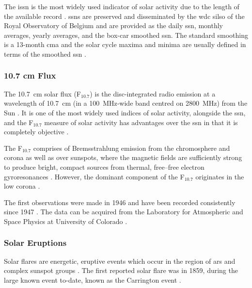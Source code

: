The \gls{issn} is the most widely used indicator of solar activity due to the length of the available record \citep{hathaway_solar_2015}. \glspl{ssn} are preserved and disseminated by the \gls{wdc} \gls{silso} of the Royal Observatory of Belgium \citep{silso_world_data_center_international_1954} and are provided as the daily \gls{ssn}, monthly averages, yearly averages, and the box-car smoothed \gls{ssn}. The standard smoothing is a 13-month \gls{cma} and the solar cycle maxima and minima are usually defined in terms of the smoothed \gls{ssn} \citep{hathaway_solar_2015}.



\subsubsection*{10.7 cm Flux}

The 10.7~cm solar flux (F$_{10.7}$) is the disc-integrated radio emission at a wavelength of 10.7~cm (in a 100~MHz‐wide band centred on 2800~MHz) from the Sun \citep{tapping_limits_1994,tapping_107_2013}. It is one of the most widely used indices of solar activity, alongside the \gls{ssn}, and the F$_{10.7}$ measure of solar activity has advantages over the \gls{ssn} in that it is completely objective \citep{hathaway_solar_2015}.

The F$_{10.7}$ comprises of Bremsstrahlung emission from the chromosphere and corona as well as over sunspots, where the magnetic fields are sufficiently strong to produce bright, compact sources from thermal, free–free electron gyroresonances \citep{tapping_origin_1990, tapping_107_2013}. However, the dominant component of the F$_{10.7}$ originates in the low corona \citep{tapping_origin_1990}.

The first observations were made in 1946 and have been recorded consistently since 1947 \citep{covington_solar_1969, tapping_107_2013}. The data can be acquired from the Laboratory for Atmospheric and Space Physics at University of Colorado \citep{lisird_solar_2019}.



\subsubsection*{Solar Eruptions}
Solar flares are energetic, eruptive events which occur in the region of \glspl{ar} and complex sunspot groups \citep{hathaway_solar_2015}. The first reported solar flare was in 1859, during the large known event to-date, known as the Carrington event \citep{carrington_description_1859}.

